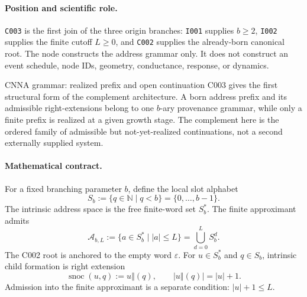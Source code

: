 
\paragraph*{Position and scientific role.}
\texttt{C003} is the first join of the three origin branches: \texttt{I001}
supplies $b\ge2$, \texttt{I002} supplies the finite cutoff $L\ge0$, and
\texttt{C002} supplies the already-born canonical root.  The node constructs
the address grammar only.  It does not construct an event schedule, node IDs,
geometry, conductance, response, or dynamics.

\begin{cnnaInfoBox}{CNNA grammar: realized prefix and open continuation}
C003 gives the first structural form of the complement architecture.  A born address prefix and its admissible right-extensions belong to one $b$-ary provenance grammar, while only a finite prefix is realized at a given growth stage.  The complement here is the ordered family of admissible but not-yet-realized continuations, not a second externally supplied system.
\end{cnnaInfoBox}

\paragraph*{Mathematical contract.}
For a fixed branching parameter $b$, define the local slot alphabet
\begin{equation}
  S_b:=\{q\in\mathbb N\mid q<b\}=\{0,\ldots,b-1\}.
  \label{eq:c003-slot-alphabet}
\end{equation}
The intrinsic address space is the free finite-word set $S_b^{*}$.  The
finite approximant admits
\begin{equation}
  \mathcal A_{b,L}:=\{a\in S_b^{*}\mid |a|\le L\}
  =\bigcup_{d=0}^{L}S_b^d.
  \label{eq:c003-bounded-addresses}
\end{equation}
The C002 root is anchored to the empty word $\varepsilon$.  For $u\in S_b^*$
and $q\in S_b$, intrinsic child formation is right extension
\begin{equation}
  \operatorname{snoc}(u,q):=u\mathbin{\Vert}(q),
  \qquad |u\mathbin{\Vert}(q)|=|u|+1.
  \label{eq:c003-child-extension}
\end{equation}
Admission into the finite approximant is a separate condition:
$|u|+1\le L$.

